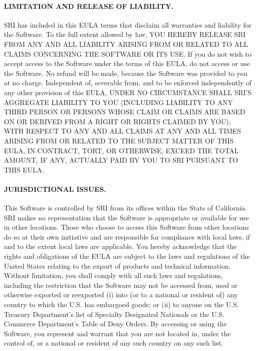 \documentclass[11pt,twoside,fleqn,openright,titlepage]{cslreport}
\begin{document}
\begin{small}
\paragraph{LIMITATION AND RELEASE OF LIABILITY.}

SRI has included  in this EULA terms that  disclaim all warranties and
liability for  the Software.  To the full  extent allowed by  law, YOU
HEREBY RELEASE SRI FROM ANY  AND ALL LIABILITY ARISING FROM OR RELATED
TO ALL CLAIMS CONCERNING THE SOFTWARE  OR ITS USE.  If you do not wish
to accept access to the Software  under the terms of this EULA, do not
access  or use  the Software.   No refund  will be  made,  because the
Software was provided to you  at no charge.  Independent of, severable
from, and to be enforced  independently of any other provision of this
EULA,  UNDER NO CIRCUMSTANCE  SHALL SRI'S  AGGREGATE LIABILITY  TO YOU
(INCLUDING LIABILITY  TO ANY  THIRD PERSON OR  PERSONS WHOSE  CLAIM OR
CLAIMS ARE BASED ON OR DERIVED FROM A RIGHT OR RIGHTS CLAIMED BY YOU),
WITH RESPECT TO  ANY AND ALL CLAIMS AT ANY AND  ALL TIMES ARISING FROM
OR RELATED TO  THE SUBJECT MATTER OF THIS EULA,  IN CONTRACT, TORT, OR
OTHERWISE, EXCEED  THE TOTAL AMOUNT, IF  ANY, ACTUALLY PAID  BY YOU TO
SRI PURSUANT TO THIS EULA.


\paragraph{JURISDICTIONAL ISSUES.}

This Software is  controlled by SRI from its  offices within the State
of  California.  SRI makes  no  representation  that  the Software  is
appropriate or available for use  in other locations. Those who choose
to  access this  Software  from other  locations  do so  at their  own
initiative and are responsible for  compliance with local laws, if and
to the extent  local laws are applicable. You  hereby acknowledge that
the rights  and obligations of  the EULA are  subject to the  laws and
regulations of  the United States  relating to the export  of products
and technical  information. Without limitation, you  shall comply with
all  such laws  and regulations,  including the  restriction  that the
Software  may not  be accessed  from,  used or  otherwise exported  or
reexported (i) into  (or to a national or resident  of) any country to
which  the  U.S.   has embargoed  goods;  or  (ii)  to anyone  on  the
U.S. Treasury  Department's list of Specialty  Designated Nationals or
the U.S. Commerce  Department's Table of Deny Orders.  By accessing or
using the Software, you represent and warrant that you are not located
in,  under the  control of,  or  a national  or resident  of any  such
country on any such list.



\end{small}
\end{document}

